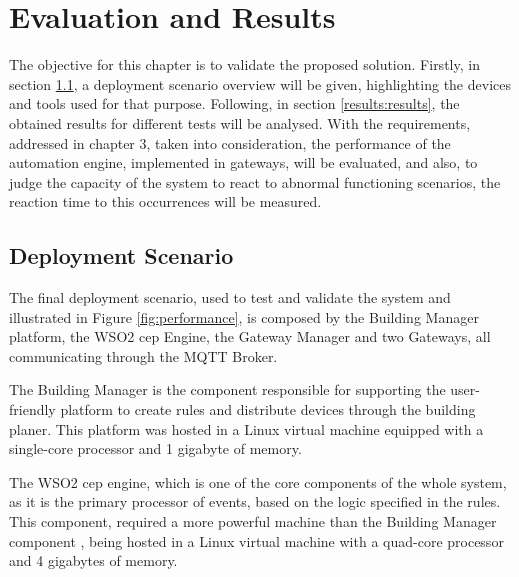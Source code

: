 \chapter{Evaluation and Results}
\label{chapter:evaluation_and_results}


The objective for this chapter is to validate the proposed solution. Firstly, in section \ref{results:scenario}, a deployment scenario overview will be given, highlighting the devices and tools used for that purpose. Following, in section \ref{results:results}, the obtained results for different tests will be analysed. With the requirements, addressed in chapter 3, taken into consideration, the performance of the automation engine, implemented in gateways, will be evaluated, and also, to judge the capacity of the system to react to abnormal functioning scenarios, the reaction time to this occurrences will be measured.

\newpage

\section{Deployment Scenario}
\label{results:scenario}



The final deployment scenario, used to test and validate the system and illustrated in Figure \ref{fig:performance}, is composed by the Building Manager platform, the WSO2 \ac{cep} Engine, the Gateway Manager and two Gateways, all communicating through the MQTT Broker. 

The Building Manager is the component responsible for supporting the user-friendly platform to create rules and distribute devices through the building planer. This platform was hosted in a Linux virtual machine equipped with a single-core processor and 1 gigabyte of memory.

The WSO2 \ac{cep} engine, which is one of the core components of the whole system, as it is the primary processor of events, based on the logic specified in the rules. This component, required a more powerful machine than the Building Manager component , being hosted in a Linux virtual machine with a quad-core processor and 4 gigabytes of memory.

